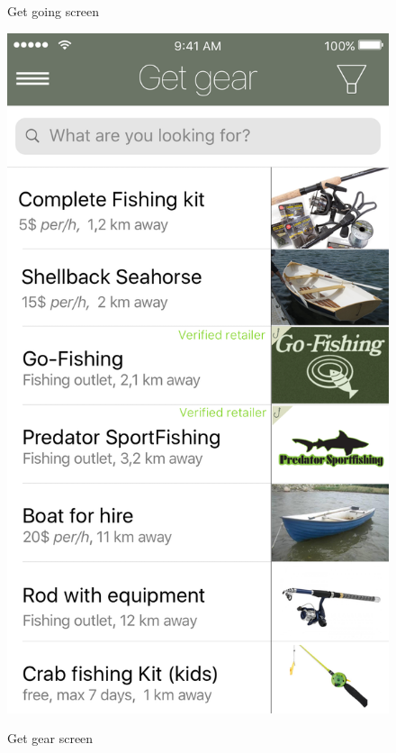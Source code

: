 \begin{figure}[H]
\begin{minipage}{0.5\textwidth}
\begin{minipage}[t]{0.47\textwidth}
  	  	\label{fig:f2}
   		\caption{Get going screen}
	\end{minipage}
	\hfill
\end{minipage}

\hspace{0cm}
\begin{minipage}{0.5\textwidth}
	\vspace{1cm}
\end{minipage}

\begin{minipage}{0.5\textwidth}
  	\hfill
  	\begin{minipage}[t]{0.47\textwidth}
  	  	\centering
  	  	\includegraphics[width=.6\textwidth]{images/Get_gear.png}
  	  	\label{fig:f3}
   		\caption{Get gear screen}
  	\end{minipage}  
  	\hfill
  	\begin{minipage}[t]{0.47\textwidth}
  	  	\centering

\end{minipage}
\end{minipage}
\end{figure}
